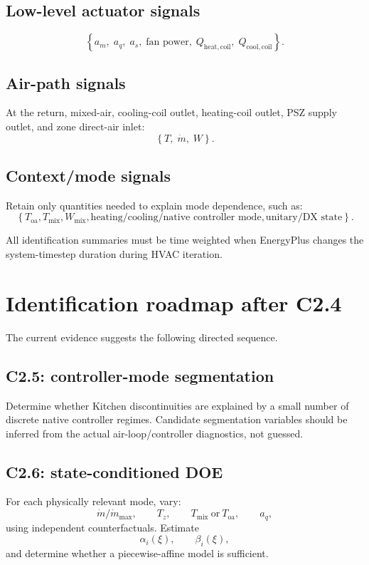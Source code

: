 \documentclass[11pt]{article}
\newcommand{\mdot}{\dot m}
\begin{document}
\subsection*{Low-level actuator signals}
\begin{equation}
\left\{
a_m,\;
a_q,\;
a_s,\;
\text{fan power},\;
Q_{\mathrm{heat,coil}},\;
Q_{\mathrm{cool,coil}}
\right\}.
\end{equation}

\subsection*{Air-path signals}
At the return, mixed-air, cooling-coil outlet, heating-coil outlet, PSZ supply
outlet, and zone direct-air inlet:
\begin{equation}
\left\{
T,\;
\mdot,\;
W
\right\}.
\end{equation}

\subsection*{Context/mode signals}
Retain only quantities needed to explain mode dependence, such as:
\begin{equation}
\left\{
T_{\mathrm{oa}},
T_{\mathrm{mix}},
W_{\mathrm{mix}},
\text{heating/cooling/native controller mode},
\text{unitary/DX state}
\right\}.
\end{equation}

All identification summaries must be time weighted when EnergyPlus changes the
system-timestep duration during HVAC iteration.

\section{Identification roadmap after C2.4}

The current evidence suggests the following directed sequence.

\subsection*{C2.5: controller-mode segmentation}
Determine whether Kitchen discontinuities are explained by a small number of
discrete native controller regimes.  Candidate segmentation variables should
be inferred from the actual air-loop/controller diagnostics, not guessed.

\subsection*{C2.6: state-conditioned DOE}
For each physically relevant mode, vary:
\begin{equation}
\mdot/\mdot_{\max},
\qquad
T_z,
\qquad
T_{\mathrm{mix}}\ \text{or}\ T_{\mathrm{oa}},
\qquad
a_q,
\end{equation}
using independent counterfactuals.  Estimate
\begin{equation}
\alpha_i(\xi),\qquad \beta_i(\xi),
\end{equation}
and determine whether a piecewise-affine model is sufficient.
\end{document}

